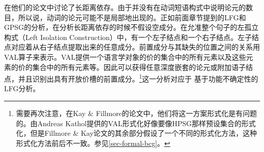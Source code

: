 \mbox{} \citet[\S~3.10]{KF99a}在他们的论文中讨论了长距离依存。由于并没有在动词短语构式中说明论元的数目，所以说，动词的论元可能不是局部地出现的。正如前面章节提到的LFG\indexlfg 和GPSG的分析\indexgpsgc，在分析长距离依存的时候不假设空成分。在允准整个句子的左孤立构式（Left Isolation Construction）中，有一个左子结点和一个右子结点。左子结点对应着从右子结点提取出来的任意成分。前置成分与其缺失的位置之间的关系用VAL算子来表示。VAL提供一个语言学对象的价的集合中的所有元素以及这些元素的价的集合中的所有元素等。因此可以获得任意深度嵌套的论元或附加语子结点，并且识别出具有开放价槽的前置成分。\footnote{%
   需要再次注意，在Kay \& Fillmore的论文中，他们将这一方案形式化是有问题的。由Andreas Kathol提供的VAL形式化好像要像HPSG那样预设集合的形式化，但是Fillmore \& Kay论文的其余部分假设了一个不同的形式化方法，这种形式化方法前后不一致。参见\ref{sec-formal-bcg}。
 }这一分析对应于 \citet{KZ89a}基于功能不确定性的LFG分析。%

